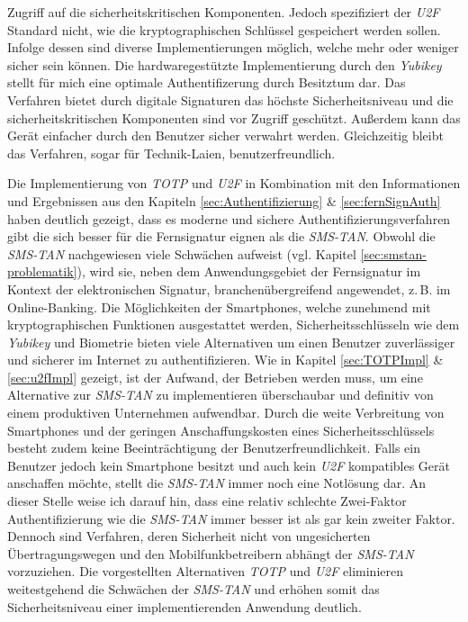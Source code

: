 \documentclass[11pt,a4paper,ngerman]{scrreprt}
\begin{document}
Zugriff auf die sicherheitskritischen Komponenten. Jedoch spezifiziert der \textit{U2F} Standard nicht, wie die kryptographischen Schlüssel gespeichert werden sollen. Infolge dessen sind diverse Implementierungen möglich, welche mehr oder weniger sicher sein können. Die hardwaregestützte Implementierung durch den \textit{Yubikey} stellt für mich eine optimale Authentifizerung durch Besitztum dar. Das Verfahren bietet durch digitale Signaturen das höchste Sicherheitsniveau und die sicherheitskritischen Komponenten sind vor Zugriff geschützt. Außerdem kann das Gerät einfacher durch den Benutzer sicher verwahrt werden. Gleichzeitig bleibt das Verfahren, sogar für Technik-Laien, benutzerfreundlich.

Die Implementierung von \textit{TOTP} und \textit{U2F} in Kombination mit den Informationen und Ergebnissen aus den Kapiteln \ref{sec:Authentifizierung} \& \ref{sec:fernSignAuth} haben deutlich gezeigt, dass es moderne und sichere Authentifizierungsverfahren gibt die sich besser für die Fernsignatur eignen als die \textit{SMS-TAN}. Obwohl die \textit{SMS-TAN} nachgewiesen viele Schwächen aufweist (vgl. Kapitel \ref{sec:smstan-problematik}), wird sie, neben dem Anwendungsgebiet der Fernsignatur im Kontext der elektronischen Signatur, branchenübergreifend angewendet, z.\,B. im Online-Banking. Die Möglichkeiten der Smartphones, welche zunehmend mit kryptographischen Funktionen ausgestattet werden, Sicherheitsschlüsseln wie dem \textit{Yubikey} und Biometrie bieten viele Alternativen um einen Benutzer zuverlässiger und sicherer im Internet zu authentifizieren. Wie in Kapitel \ref{sec:TOTPImpl} \& \ref{sec:u2fImpl} gezeigt, ist der Aufwand, der Betrieben werden muss, um eine Alternative zur \textit{SMS-TAN} zu implementieren überschaubar und definitiv von einem produktiven Unternehmen aufwendbar. Durch die weite Verbreitung von Smartphones und der geringen Anschaffungskosten eines Sicherheitsschlüssels besteht zudem keine Beeinträchtigung der Benutzerfreundlichkeit. Falls ein Benutzer jedoch kein Smartphone besitzt und auch kein \textit{U2F} kompatibles Gerät anschaffen möchte, stellt die \textit{SMS-TAN} immer noch eine Notlösung dar. An dieser Stelle weise ich darauf hin, dass eine relativ schlechte Zwei-Faktor Authentifizierung wie die \textit{SMS-TAN} immer besser ist als gar kein zweiter Faktor. Dennoch sind Verfahren, deren Sicherheit nicht von ungesicherten Übertragungswegen und den Mobilfunkbetreibern abhängt der \textit{SMS-TAN} vorzuziehen. Die vorgestellten Alternativen \textit{TOTP} und \textit{U2F} eliminieren weitestgehend die Schwächen der \textit{SMS-TAN} und erhöhen somit das Sicherheitsniveau einer implementierenden Anwendung deutlich.
\end{document}
